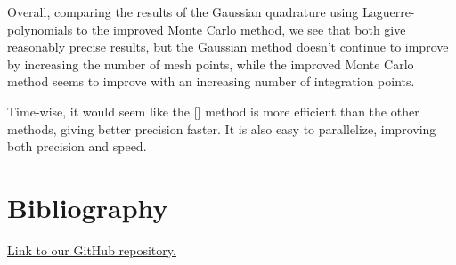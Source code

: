 \documentclass{article}
\begin{document}
	Overall, comparing the results of the Gaussian quadrature using Laguerre-polynomials to the improved Monte Carlo method, we see that both give reasonably precise results, but the Gaussian method doesn't continue to improve by increasing the number of mesh points, while the improved Monte Carlo method seems to improve with an increasing number of integration points.

	Time-wise, it would seem like the [] method is more efficient than the other methods, giving better precision faster. It is also easy to parallelize, improving both precision and speed.

\section*{Bibliography}
	\href{https://github.com/emmernme/MENA-Compfys/tree/master/Project3}{Link to our GitHub repository.}
\end{document}
